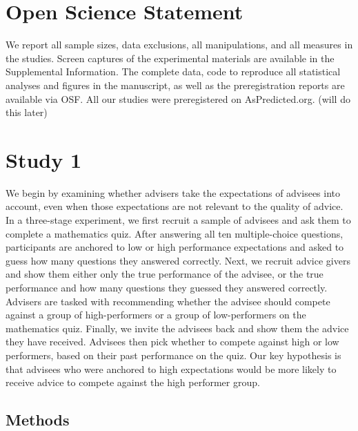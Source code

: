\documentclass[
  man,floatsintext]{apa6}
\begin{document}
\hypertarget{open-science-statement}{%
\section{Open Science Statement}\label{open-science-statement}}

We report all sample sizes, data exclusions, all manipulations, and all measures in the studies. Screen captures of the experimental materials are available in the Supplemental Information. The complete data, code to reproduce all statistical analyses and figures in the manuscript, as well as the preregistration reports are available via OSF. All our studies were preregistered on AsPredicted.org. (will do this later)

\hypertarget{study-1}{%
\section{Study 1}\label{study-1}}

We begin by examining whether advisers take the expectations of advisees into account, even when those expectations are not relevant to the quality of advice. In a three-stage experiment, we first recruit a sample of advisees and ask them to complete a mathematics quiz. After answering all ten multiple-choice questions, participants are anchored to low or high performance expectations and asked to guess how many questions they answered correctly. Next, we recruit advice givers and show them either only the true performance of the advisee, or the true performance and how many questions they guessed they answered correctly. Advisers are tasked with recommending whether the advisee should compete against a group of high-performers or a group of low-performers on the mathematics quiz. Finally, we invite the advisees back and show them the advice they have received. Advisees then pick whether to compete against high or low performers, based on their past performance on the quiz. Our key hypothesis is that advisees who were anchored to high expectations would be more likely to receive advice to compete against the high performer group.

\hypertarget{methods}{%
\subsection{Methods}\label{methods}}
\end{document}

